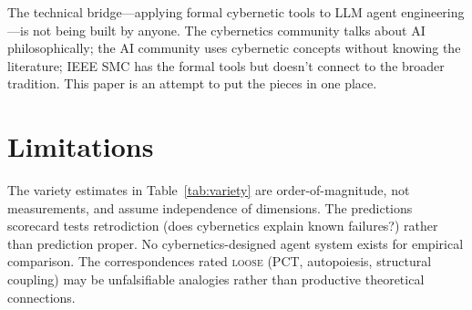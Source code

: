 \documentclass[11pt]{article}
\begin{document}
The technical bridge---applying formal cybernetic tools to LLM agent engineering---is not being built by anyone. The cybernetics community talks about AI philosophically; the AI community uses cybernetic concepts without knowing the literature; IEEE SMC has the formal tools but doesn't connect to the broader tradition. This paper is an attempt to put the pieces in one place.

\section*{Limitations}

The variety estimates in Table~\ref{tab:variety} are order-of-magnitude, not measurements, and assume independence of dimensions. The predictions scorecard tests retrodiction (does cybernetics explain known failures?) rather than prediction proper. No cybernetics-designed agent system exists for empirical comparison. The correspondences rated \textsc{loose} (PCT, autopoiesis, structural coupling) may be unfalsifiable analogies rather than productive theoretical connections.



\end{document}
